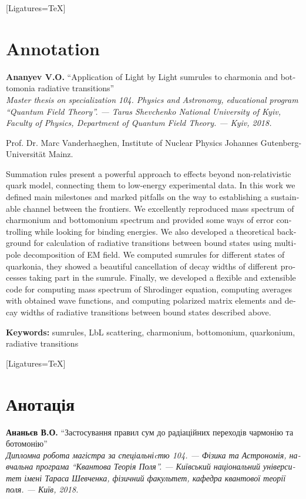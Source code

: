 \begin{titlepage}
    \fontsize{12}{12}\linespread{1.2}\selectfont
    \begin{otherlanguage}{english}
    [Ligatures=TeX]
    \section*{Annotation}
    \textbf{Ananyev V.O.} ``Application of Light by Light sumrules to charmonia and bottomonia radiative transitions'' \\
    {\itshape Master thesis on specialization 104. Physics and Astronomy, educational program ``Quantum Field Theory''. --- Taras Shevchenko National University of Kyiv, Faculty of Physics, Department of Quantum Field Theory. --- Kyiv, 2018.}

     Prof. Dr. Marc Vanderhaeghen, Institute of Nuclear Physics
Johannes Gutenberg-Universität Mainz.

        Summation rules present a powerful approach to effects beyond non-relativistic quark model, connecting them to low-energy experimental data. In this work we defined main milestones and marked pitfalls on the way to establishing a sustainable channel between the frontiers. We excellently reproduced mass spectrum of charmonium and bottomonium spectrum and provided some ways of error controlling while looking for binding energies. We also developed a theoretical background for calculation of radiative transitions between bound states using multipole decomposition of EM field. We computed sumrules for different states of quarkonia, they showed a beautiful cancellation of decay widths of different processes taking part in the sumrule. Finally, we developed a flexible and extensible code for computing mass spectrum of Shrodinger equation, computing averages with obtained wave functions, and computing polarized matrix elements and decay widths of radiative transitions between bound states described above.

    \textbf{Keywords:} sumrules, LbL scattering, charmonium, bottomonium, quarkonium, radiative transitions
    \end{otherlanguage}
    \vspace{-1cm}
    \begin{otherlanguage}{ukrainian}
    [Ligatures=TeX]
    \section*{Анотація}
    \textbf{Ананьєв В.О.} ``Застосування правил сум до радіаційних переходів чармонію та ботомонію'' \\
    {\itshape Дипломна робота магістра за спеціальніcтю 104. --- Фізика та Астрономія, навчальна програма ``Квантова Теорія Поля''. --- Київський національний університет імені Тараса Шевченка, фізичний факультет, кафедра квантової теорії поля. --- Київ, 2018.}


\end{otherlanguage}
\end{titlepage}
